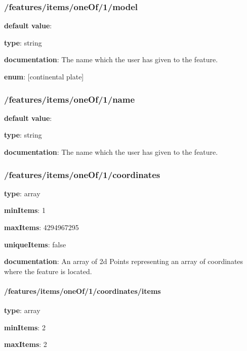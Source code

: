 \subsubsection{/features/items/oneOf/1/model} \begin{itemized}
\item {\bf default value}: 
\item {\bf type}: string
\item {\bf documentation}: The name which the user has given to the feature.
\item {\bf enum}: [continental plate]\end{itemized}\subsubsection{/features/items/oneOf/1/name} \begin{itemized}
\item {\bf default value}: 
\item {\bf type}: string
\item {\bf documentation}: The name which the user has given to the feature.
\end{itemized}\subsubsection{/features/items/oneOf/1/coordinates} \begin{itemized}
\item {\bf type}: array
\item {\bf minItems}: 1
\item {\bf maxItems}: 4294967295
\item {\bf uniqueItems}: false
\item {\bf documentation}: An array of 2d Points representing an array of coordinates where the feature is located.
\paragraph{/features/items/oneOf/1/coordinates/items} \begin{itemized}
\item {\bf type}: array
\item {\bf minItems}: 2
\item {\bf maxItems}: 2

\end{itemized}
\end{itemized}
